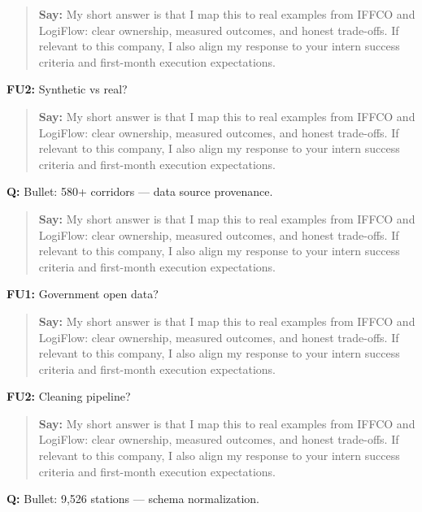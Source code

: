 \documentclass[9pt,a4paper]{article}
\begin{document}
\begin{quote}\small\textbf{Say:} My short answer is that I map this to real examples from IFFCO and LogiFlow: clear ownership, measured outcomes, and honest trade-offs. If relevant to this company, I also align my response to your intern success criteria and first-month execution expectations.\end{quote}
\vspace{2mm}
\textbf{FU2:} Synthetic vs real?

\begin{quote}\small\textbf{Say:} My short answer is that I map this to real examples from IFFCO and LogiFlow: clear ownership, measured outcomes, and honest trade-offs. If relevant to this company, I also align my response to your intern success criteria and first-month execution expectations.\end{quote}
\vspace{2mm}
\textbf{Q:} Bullet: 580+ corridors --- data source provenance.

\begin{quote}\small\textbf{Say:} My short answer is that I map this to real examples from IFFCO and LogiFlow: clear ownership, measured outcomes, and honest trade-offs. If relevant to this company, I also align my response to your intern success criteria and first-month execution expectations.\end{quote}
\vspace{2mm}
\textbf{FU1:} Government open data?

\begin{quote}\small\textbf{Say:} My short answer is that I map this to real examples from IFFCO and LogiFlow: clear ownership, measured outcomes, and honest trade-offs. If relevant to this company, I also align my response to your intern success criteria and first-month execution expectations.\end{quote}
\vspace{2mm}
\textbf{FU2:} Cleaning pipeline?

\begin{quote}\small\textbf{Say:} My short answer is that I map this to real examples from IFFCO and LogiFlow: clear ownership, measured outcomes, and honest trade-offs. If relevant to this company, I also align my response to your intern success criteria and first-month execution expectations.\end{quote}
\vspace{2mm}
\textbf{Q:} Bullet: 9,526 stations --- schema normalization.
\end{document}
